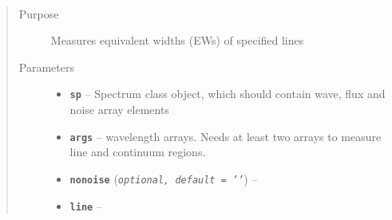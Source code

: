 \documentclass[letterpaper,10pt,english]{sphinxmanual}
\begin{document}
\begin{fulllineitems}
\label{api:splat.measureEW}~\begin{quote}\begin{description}
\item[{Purpose}] \leavevmode
Measures equivalent widths (EWs) of specified lines

\item[{Parameters}] \leavevmode\begin{itemize}
\item {} 
\textbf{\texttt{sp}} -- Spectrum class object, which should contain wave, flux and noise array elements

\item {} 
\textbf{\texttt{args}} -- wavelength arrays. Needs at least two arrays to measure line and continuum regions.

\item {} 
\textbf{\texttt{nonoise}} (\emph{\texttt{optional, default = '{'}}}) -- 

\item {} 
\textbf{\texttt{line}} -- 

\end{itemize}

\end{description}\end{quote}

\end{fulllineitems}

\end{document}
